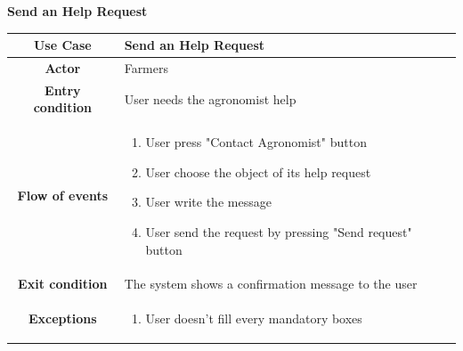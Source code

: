 \documentclass[table, 12pt]{article}
\begin{document}
\begin{itemize}
            
            \begin{table}[H]
                \item[] \textbf{Send an Help Request}
                \item[] 
                \centering
                \begin{tabular}{c m{}}
                    \hline
                    \textbf{Use Case} & Send an Help Request\\ \hline
                    \textbf{Actor} & Farmers\\ \hline
                    \textbf{Entry condition} & User needs the agronomist help\\  \hline
                    \textbf{Flow of events} & \begin{enumerate}
                                                \item User press "Contact Agronomist" button
                                                \item User choose the object of its help request
                                                \item User write the message
                                                \item User send the request by pressing "Send request" button
                                            \end{enumerate}\\ \hline
                    \textbf{Exit condition} & The system shows a confirmation message to the user \\ \hline
                    \textbf{Exceptions} &  \begin{enumerate}
                        \item User doesn't fill every mandatory boxes 
                    \end{enumerate}\\ \hline                    
                \end{tabular}
            \end{table}


\end{itemize}
\end{document}
